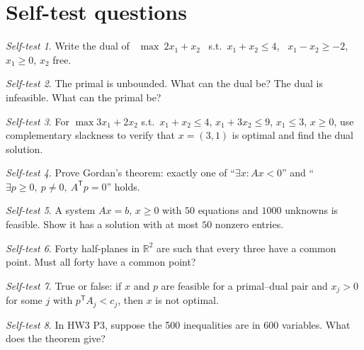 \documentclass[11pt]{article}
\newcommand{\R}{\mathbb{R}}
\newcommand{\T}{^{\mathsf T}}
\theoremstyle{definition}
\theoremstyle{plain}
\theoremstyle{remark}
\newtheorem{exercise}{Self-test}
\begin{document}
\section{Self-test questions}
\begin{exercise} Write the dual of \ $\max\ 2x_1+x_2$ \ s.t.\ $x_1+x_2\le4$, \ $x_1-x_2\ge-2$, \ $x_1\ge0$, $x_2$ free.\end{exercise}
\begin{exercise} The primal is unbounded. What can the dual be? The dual is infeasible. What can the primal be?\end{exercise}
\begin{exercise} For $\max3x_1+2x_2$ s.t.\ $x_1+x_2\le4$, $x_1+3x_2\le9$, $x_1\le3$, $x\ge0$, use complementary slackness to verify that $x=(3,1)$ is optimal and find the dual solution.\end{exercise}
\begin{exercise} Prove Gordan's theorem: exactly one of ``$\exists x:Ax<0$'' and ``$\exists p\ge0,\ p\ne0,\ A\T p=0$'' holds.\end{exercise}
\begin{exercise} A system $Ax=b$, $x\ge0$ with $50$ equations and $1000$ unknowns is feasible. Show it has a solution with at most $50$ nonzero entries.\end{exercise}
\begin{exercise} Forty half-planes in $\R^2$ are such that every three have a common point. Must all forty have a common point?\end{exercise}
\begin{exercise} True or false: if $x$ and $p$ are feasible for a primal--dual pair and $x_j>0$ for some $j$ with $p\T A_j<c_j$, then $x$ is not optimal.\end{exercise}
\begin{exercise} In HW3 P3, suppose the 500 inequalities are in 600 variables. What does the theorem give?\end{exercise}
\end{document}
